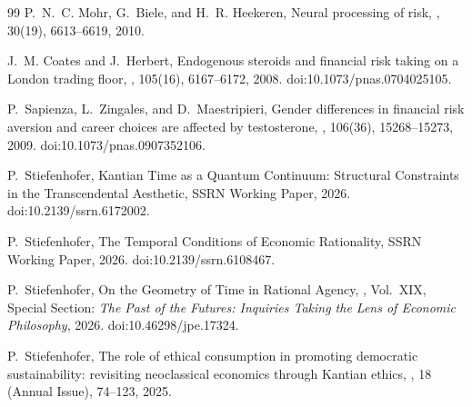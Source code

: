\documentclass[graybox,natbib]{SNmult}
\providecommand{\1}{}
\renewcommand{\1}{\mathbbm 1}
\begin{document}
\begin{thebibliography}{99}
P.~N.~C. Mohr, G.~Biele, and H.~R. Heekeren,
\newblock Neural processing of risk,
,
30(19), 6613--6619, 2010.


J.~M. Coates and J.~Herbert,
\newblock Endogenous steroids and financial risk taking on a London trading
floor,
,
105(16), 6167--6172, 2008.
\newblock doi:10.1073/pnas.0704025105.

P.~Sapienza, L.~Zingales, and D.~Maestripieri,
\newblock Gender differences in financial risk aversion and career choices
are affected by testosterone,
,
106(36), 15268--15273, 2009.
\newblock doi:10.1073/pnas.0907352106.








P.~Stiefenhofer,
\newblock Kantian Time as a Quantum Continuum: Structural Constraints in the Transcendental Aesthetic,
\newblock SSRN Working Paper, 2026.
\newblock doi:10.2139/ssrn.6172002.


P.~Stiefenhofer,
\newblock The Temporal Conditions of Economic Rationality,
\newblock SSRN Working Paper, 2026.
\newblock doi:10.2139/ssrn.6108467.

P.~Stiefenhofer,
\newblock On the Geometry of Time in Rational Agency,
,
Vol.~XIX, Special Section: \emph{The Past of the Futures: Inquiries Taking the Lens of Economic Philosophy},
2026.
\newblock doi:10.46298/jpe.17324.

P.~Stiefenhofer,
\newblock The role of ethical consumption in promoting democratic sustainability:
revisiting neoclassical economics through Kantian ethics,
,
18 (Annual Issue), 74--123, 2025.




\end{thebibliography}
\end{document}
